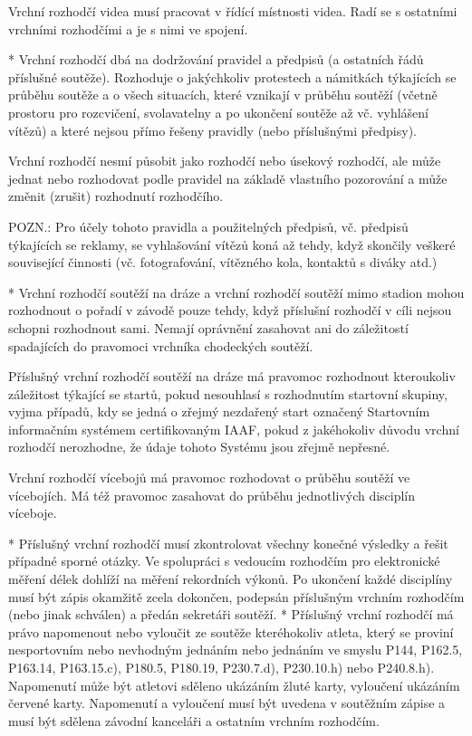 Vrchní rozhodčí videa musí pracovat v řídící místnosti videa. Radí se s ostatními vrchními rozhodčími a je s nimi ve spojení.

* Vrchní rozhodčí dbá na dodržování pravidel a předpisů (a ostatních řádů příslušné soutěže). Rozhoduje o jakýchkoliv protestech a námitkách týkajících se průběhu soutěže a o všech situacích, které vznikají v průběhu soutěží (včetně prostoru pro rozcvičení, svolavatelny a po ukončení soutěže až vč. vyhlášení vítězů) a které nejsou přímo řešeny pravidly (nebo příslušnými předpisy).

Vrchní rozhodčí nesmí působit jako rozhodčí nebo úsekový rozhodčí, ale může jednat nebo rozhodovat podle pravidel na základě vlastního pozorování a může změnit (zrušit)  rozhodnutí rozhodčího.

POZN.: Pro účely tohoto pravidla a použitelných předpisů, vč. předpisů týkajících se reklamy, se vyhlašování vítězů koná až tehdy, když skončily veškeré související činnosti (vč. fotografování, vítězného kola, kontaktů s diváky atd.)

* Vrchní rozhodčí soutěží na dráze a vrchní rozhodčí soutěží mimo stadion mohou rozhodnout o pořadí v závodě pouze tehdy, když příslušní rozhodčí v cíli nejsou schopni rozhodnout sami. Nemají oprávnění zasahovat ani do záležitostí spadajících do pravomoci vrchníka chodeckých soutěží.

Příslušný vrchní rozhodčí soutěží na dráze má pravomoc rozhodnout kteroukoliv záležitost týkající se startů, pokud nesouhlasí s rozhodnutím startovní skupiny, vyjma případů, kdy se jedná o zřejmý nezdařený start označený Startovním informačním systémem certifikovaným IAAF, pokud z jakéhokoliv důvodu vrchní rozhodčí nerozhodne, že údaje tohoto Systému jsou zřejmě nepřesné.

Vrchní rozhodčí vícebojů má pravomoc rozhodovat o průběhu soutěží ve vícebojích. Má též pravomoc zasahovat do průběhu jednotlivých disciplín víceboje.

* Příslušný vrchní rozhodčí musí zkontrolovat všechny konečné výsledky a řešit případné sporné otázky. Ve spolupráci s vedoucím rozhodčím pro elektronické měření délek dohlíží na měření rekordních výkonů. Po ukončení každé disciplíny musí být zápis okamžitě zcela dokončen, podepsán příslušným vrchním rozhodčím (nebo jinak schválen) a předán sekretáři soutěží.
* Příslušný vrchní rozhodčí má právo napomenout nebo vyloučit ze soutěže kteréhokoliv atleta, který se proviní nesportovním nebo nevhodným jednáním nebo jednáním ve smyslu P144, P162.5, P163.14, P163.15.c), P180.5, P180.19, P230.7.d), P230.10.h) nebo P240.8.h). Napomenutí může být atletovi sděleno ukázáním žluté karty, vyloučení ukázáním červené karty. Napomenutí a vyloučení musí být uvedena v soutěžním zápise a musí být sdělena závodní kanceláři a ostatním vrchním rozhodčím.

